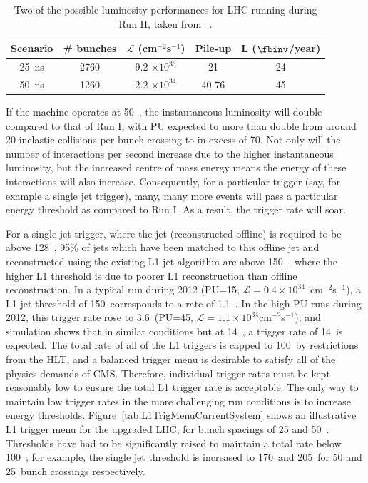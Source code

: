 \begin{table}[h]
\begin{tabular}{c|c|c|c|c}
Scenario & \# bunches & $\mathcal{L}$ (cm$^{-2}$s$^{-1}$) & Pile-up & L ($\fbinv$/year) \\ \hline
25~ns & 2760 & 9.2 $\times 10^{33}$ & 21 & 24 \\ 
50~ns & 1260 & 2.2 $\times 10^{34}$ & 40-76 & 45 \\ \hline
\end{tabular}
\caption{\label{lumiProgramme} Two of the possible luminosity performances for \ac{LHC} running during Run II, taken from ~\cite{Tapper:1556311}.}
\end{table}


If the machine operates at 50~\ns, the instantaneous luminosity will double compared to that of Run I, with PU expected to more than double from around 20 inelastic collisions per bunch crossing to in excess of 70.
Not only will the number of interactions per second increase due to the higher instantaneous luminosity, but the increased centre of mass energy means the energy of these interactions will also increase. 
Consequently, for a particular trigger (say, for example a single jet trigger), many, many more events will pass a particular energy threshold as compared to Run I. 
As a result, the trigger rate will soar.

For a single jet trigger, where the jet (reconstructed offline) is required to be above 128~\GeV, 95\% of jets which have been matched to this offline jet and reconstructed using the existing \ac{L1} jet algorithm are above 150~\GeV - where the higher \ac{L1} threshold is due to poorer \ac{L1} reconstruction than offline reconstruction. 
In a typical run during 2012 (PU=15, $\mathcal{L}=0.4 \times 10^{34}$~cm$^{-2}$s$^{-1}$), a \ac{L1} jet threshold of 150~\GeV corresponds to a rate of 1.1~\kHz.
In the high \ac{PU} runs during 2012, this trigger rate rose to 3.6~\kHz (PU=45, $\mathcal{L}=1.1 \times 10^{34}$cm$^{-2}$s$^{-1}$); and simulation shows that in similar conditions but at 14~\TeV, a trigger rate of 14~\kHz is expected.
The total rate of all of the \ac{L1} triggers is capped to 100~\kHz by restrictions from the \ac{HLT}, 
and a balanced trigger menu is desirable to satisfy all of the physics demands of \ac{CMS}.
Therefore, individual trigger rates must be kept reasonably low to ensure the total \ac{L1} trigger rate is acceptable.  
The only way to maintain low trigger rates in the more challenging run conditions is to increase energy thresholds.
Figure~\ref{tab:L1TrigMenuCurrentSystem} shows an illustrative \ac{L1} trigger menu for the upgraded \ac{LHC}, for bunch spacings of 25 and 50~\ns. 
Thresholds have had to be significantly raised to maintain a total rate below 100~\kHz; for example, the single jet threshold is increased to 170~\GeV and 205~\GeV for 50 and 25~\ns bunch crossings respectively.


